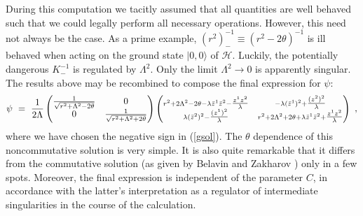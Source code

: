 \documentclass[a4paper,11pt,english]{article}
\numberwithin{equation}{section}
\renewcommand{\=}{\ =\ }
\begin{document}
During this computation we tacitly assumed that all quantities are well 
behaved such that we could legally perform all necessary operations. 
However, this need not always be the case.
As a prime example, $(r^2)_-^{-1}\equiv(r^2{-}2\theta)^{-1}$ is ill behaved 
when acting on the ground state $|0,0\rangle $ of $\mathcal{H}$. 
Luckily, the potentially dangerous $K_-^{-1}$ is regulated by $\Lambda^2$.
Only the limit $\Lambda^2\to0$ is apparently singular. 
The results above may be recombined to compose the final expression for $\psi$:
\begin{equation}\label{solpsi}
 \psi\=\frac{1}{2\Lambda}
       \begin{pmatrix} \frac{1}{\sqrt{r^2+\Lambda^2-2\theta}} & 0\\%
                                                            0 &  \frac{1}%
{\sqrt{r^2+\Lambda^2+2\theta}}
       \end{pmatrix}
       \begin{pmatrix} {\scriptstyle r^2+2\Lambda^2-2\theta-\lambda \bar{%
z}^1\bar{z}^2-}\frac{z^1z^2}{\lambda}%
         & {\scriptstyle -\lambda(\bar{z}^1)^2+}\frac{(z^2)^2}{\lambda}\\%

           {\scriptstyle \lambda(\bar{z}^2)^2-}\frac{(z^1)^2}{\lambda}%
         & {\scriptstyle r^2+2\Lambda^2+2\theta+\lambda\bar{z}^1\bar{z}^2%
+}\frac{z^1z^2}{\lambda}
       \end{pmatrix}\ ,
\end{equation}
where we have chosen the negative sign in (\ref{gsol}). 
The $\theta$ dependence of this noncommutative solution is very simple.
It is also quite remarkable that it differs from the commutative solution 
(as given by Belavin and Zakharov \cite{Belavin:cz}) only in a few spots.
Moreover, the final expression is independent of the parameter $C$, 
in accordance with the latter's interpretation as a regulator of intermediate
singularities in the course of the calculation.
\end{document}
